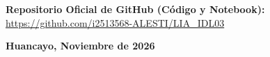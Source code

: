\documentclass[11pt,a4paper]{article}
\begin{document}
\begin{titlepage}
\begin{minipage}{0.44\textwidth}
    \end{minipage}
    
    \vspace{0.8cm}
    \begin{tcolorbox}[colback=white,colframe=ContinentalBlue,arc=2mm,boxrule=0.8pt,halign=center]
        \small\textbf{\color{ContinentalBlue}Repositorio Oficial de GitHub (Código y Notebook):}\\
        \url{https://github.com/i2513568-ALESTI/LIA_IDL03}
    \end{tcolorbox}
    
    \vspace{1.5cm}
    {\large\textbf{Huancayo, Noviembre de 2026}}
\end{titlepage}

\newpage
{}
\end{document}
